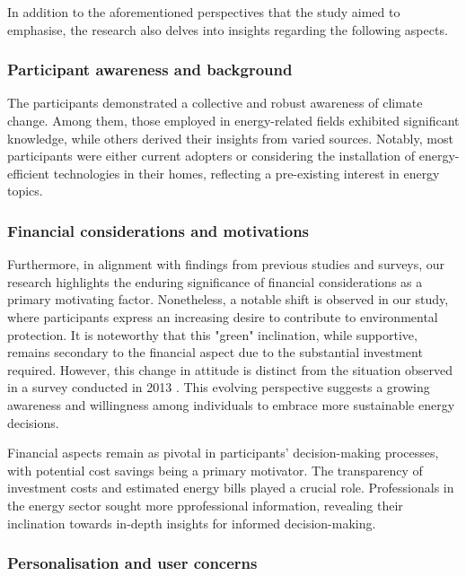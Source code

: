 In addition to the aforementioned perspectives that the study aimed to emphasise, the research also delves into insights regarding the following aspects.


\subsubsection*{Participant awareness and background}

The participants demonstrated a collective and robust awareness of climate change. 
Among them, those employed in energy-related fields exhibited significant knowledge, while others derived their insights from varied sources. 
Notably, most participants were either current adopters or considering the installation of energy-efficient technologies in their homes, reflecting a pre-existing interest in energy topics.


\subsubsection*{Financial considerations and motivations}

Furthermore, in alignment with findings from previous studies and surveys, our research highlights the enduring significance of financial considerations as a primary motivating factor. 
Nonetheless, a notable shift is observed in our study, where participants express an increasing desire to contribute to environmental protection.
It is noteworthy that this "green" inclination, while supportive, remains secondary to the financial aspect due to the substantial investment required. 
However, this change in attitude is distinct from the situation observed in a survey conducted in 2013 \cite{informationgap}. 
This evolving perspective suggests a growing awareness and willingness among individuals to embrace more sustainable energy decisions.

Financial aspects remain as pivotal in participants' decision-making processes, with potential cost savings being a primary motivator. 
The transparency of investment costs and estimated energy bills played a crucial role. 
Professionals in the energy sector sought more pprofessional information, revealing their inclination towards in-depth insights for informed decision-making.


\subsubsection*{Personalisation and user concerns}

